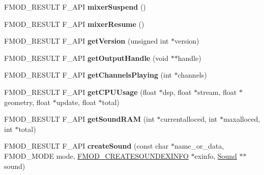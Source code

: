 \begin{DoxyCompactItemize}
\item 
\hypertarget{class_f_m_o_d_1_1_system_a6e53642e611a3d789821576dc95a2e20}{F\+M\+O\+D\+\_\+\+R\+E\+S\+U\+L\+T F\+\_\+\+A\+P\+I {\bfseries mixer\+Suspend} ()}\label{class_f_m_o_d_1_1_system_a6e53642e611a3d789821576dc95a2e20}

\item 
\hypertarget{class_f_m_o_d_1_1_system_af95cc86f56519233a4b2a8048ce92ef7}{F\+M\+O\+D\+\_\+\+R\+E\+S\+U\+L\+T F\+\_\+\+A\+P\+I {\bfseries mixer\+Resume} ()}\label{class_f_m_o_d_1_1_system_af95cc86f56519233a4b2a8048ce92ef7}

\item 
\hypertarget{class_f_m_o_d_1_1_system_ac248a1234309ccb8be4c69f6b1a8d07e}{F\+M\+O\+D\+\_\+\+R\+E\+S\+U\+L\+T F\+\_\+\+A\+P\+I {\bfseries get\+Version} (unsigned int $\ast$version)}\label{class_f_m_o_d_1_1_system_ac248a1234309ccb8be4c69f6b1a8d07e}

\item 
\hypertarget{class_f_m_o_d_1_1_system_a0bd90d8ae95bad9f2cca9658b73da96d}{F\+M\+O\+D\+\_\+\+R\+E\+S\+U\+L\+T F\+\_\+\+A\+P\+I {\bfseries get\+Output\+Handle} (void $\ast$$\ast$handle)}\label{class_f_m_o_d_1_1_system_a0bd90d8ae95bad9f2cca9658b73da96d}

\item 
\hypertarget{class_f_m_o_d_1_1_system_a5188b4b34e150daf4cc64dde24ad1c1c}{F\+M\+O\+D\+\_\+\+R\+E\+S\+U\+L\+T F\+\_\+\+A\+P\+I {\bfseries get\+Channels\+Playing} (int $\ast$channels)}\label{class_f_m_o_d_1_1_system_a5188b4b34e150daf4cc64dde24ad1c1c}

\item 
\hypertarget{class_f_m_o_d_1_1_system_a3faa4a44c39af4c49f5812bb000c43d4}{F\+M\+O\+D\+\_\+\+R\+E\+S\+U\+L\+T F\+\_\+\+A\+P\+I {\bfseries get\+C\+P\+U\+Usage} (float $\ast$dsp, float $\ast$stream, float $\ast$geometry, float $\ast$update, float $\ast$total)}\label{class_f_m_o_d_1_1_system_a3faa4a44c39af4c49f5812bb000c43d4}

\item 
\hypertarget{class_f_m_o_d_1_1_system_a406c76a44c183773616569d2cdec2036}{F\+M\+O\+D\+\_\+\+R\+E\+S\+U\+L\+T F\+\_\+\+A\+P\+I {\bfseries get\+Sound\+R\+A\+M} (int $\ast$currentalloced, int $\ast$maxalloced, int $\ast$total)}\label{class_f_m_o_d_1_1_system_a406c76a44c183773616569d2cdec2036}

\item 
\hypertarget{class_f_m_o_d_1_1_system_aca0782c1d367a54ddf00aea484971735}{F\+M\+O\+D\+\_\+\+R\+E\+S\+U\+L\+T F\+\_\+\+A\+P\+I {\bfseries create\+Sound} (const char $\ast$name\+\_\+or\+\_\+data, F\+M\+O\+D\+\_\+\+M\+O\+D\+E mode, \hyperlink{struct_f_m_o_d___c_r_e_a_t_e_s_o_u_n_d_e_x_i_n_f_o}{F\+M\+O\+D\+\_\+\+C\+R\+E\+A\+T\+E\+S\+O\+U\+N\+D\+E\+X\+I\+N\+F\+O} $\ast$exinfo, \hyperlink{class_f_m_o_d_1_1_sound}{Sound} $\ast$$\ast$sound)}\label{class_f_m_o_d_1_1_system_aca0782c1d367a54ddf00aea484971735}


\end{DoxyCompactItemize}
